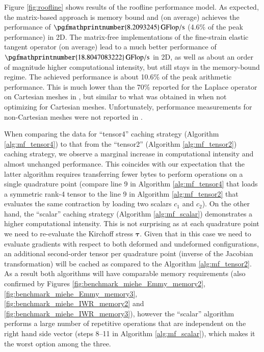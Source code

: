 \documentclass[times,doublespace]{nmeauth}
\newcommand*{\gz}[1]{\boldsymbol{#1}}
\begin{document}
Figure \ref{fig:roofline} shows results of the roofline performance model.
As expected, the matrix-based approach is memory bound and (on average) achieves the performance of $\pgfmathprintnumber{8.2093245}\,\rm{GFlop/s}$ (4.6\% of the peak performance) in 2D.
The matrix-free implementations of the fine-strain elastic tangent operator (on average) lead to a much better performance of
$\pgfmathprintnumber{18.8047083222}\,\rm{GFlop/s}$ in 2D, as well as about an order of magnitude higher computational intensity, but still stays in the memory-bound regime.
The achieved performance is about 10.6\% of the peak arithmetic performance. This is much lower than the
70\% reported for the Laplace operator on Cartesian meshes in \cite{kronbichler12}, but similar to what was obtained in \cite[Figure 14]{kronbichler2017fast} when not optimizing for Cartesian meshes.
Unfortunately, performance measurements for non-Cartesian meshes were not reported in \cite{kronbichler12}.

When comparing the data for ``tensor4'' caching strategy (Algorithm \ref{alg:mf_tensor4}) to that from the ``tensor2'' (Algorithm \ref{alg:mf_tensor2}) caching strategy,
we observe a marginal increase in computational intensity and almost unchanged performance.
This coincides with our expectation that the latter algorithm requires transferring fewer bytes to perform operations on a single quadrature point
(compare line 9 in Algorithm \ref{alg:mf_tensor4} that loads a symmetric rank-4 tensor to the line 9 in Algorithm \ref{alg:mf_tensor2} that evaluates the
same contraction by loading two scalars $c_1$ and $c_2$).
On the other hand, the ``scalar'' caching strategy (Algorithm \ref{alg:mf_scalar}) demonstrates a higher computational intensity.
This is not surprising as at each quadrature point we need to re-evaluate the Kirchoff stress $\gz \tau$.
Given that in this case we need to evaluate gradients with respect to both deformed and undeformed configurations, an additional
second-order tensor per quadrature point (inverse of the Jacobian transformation) will be cached as compared to the Algorithm \ref{alg:mf_tensor2}.
As a result both algorithms will have comparable memory requirements (also confirmed by Figures \ref{fig:benchmark_miehe_Emmy_memory2}, \ref{fig:benchmark_miehe_Emmy_memory3}, \ref{fig:benchmark_miehe_IWR_memory2} and \ref{fig:benchmark_miehe_IWR_memory3}),
however the ``scalar'' algorithm performs a large number of repetitive operations that are
independent on the right hand side vector (steps 8--11 in Algorithm \ref{alg:mf_scalar}), which makes it the worst option among the three.
\end{document}
